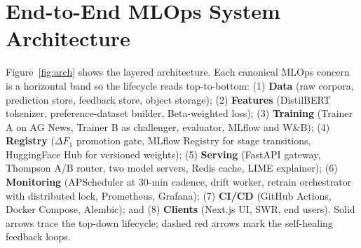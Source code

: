 \documentclass[11pt, a4paper]{article}
\begin{document}
\vspace{-0.3em}
\section{End-to-End MLOps System Architecture}

Figure~\ref{fig:arch} shows the layered architecture. Each canonical MLOps concern is a horizontal band so the lifecycle reads top-to-bottom: (1) \textbf{Data} (raw corpora, prediction store, feedback store, object storage); (2) \textbf{Features} (DistilBERT tokenizer, preference-dataset builder, Beta-weighted loss); (3) \textbf{Training} (Trainer A on AG News, Trainer B as challenger, evaluator, MLflow and W\&B); (4) \textbf{Registry} ($\Delta F_1$ promotion gate, MLflow Registry for stage transitions, HuggingFace Hub for versioned weights); (5) \textbf{Serving} (FastAPI gateway, Thompson A/B router, two model servers, Redis cache, LIME explainer); (6) \textbf{Monitoring} (APScheduler at 30-min cadence, drift worker, retrain orchestrator with distributed lock, Prometheus, Grafana); (7) \textbf{CI/CD} (GitHub Actions, Docker Compose, Alembic); and (8) \textbf{Clients} (Next.js UI, SWR, end users). Solid arrows trace the top-down lifecycle; dashed red arrows mark the self-healing feedback loops.
\end{document}
